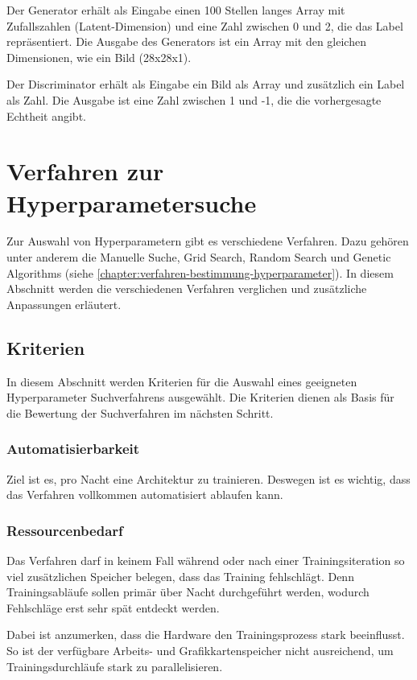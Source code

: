 Der Generator erhält als Eingabe einen 100 Stellen langes Array mit Zufallszahlen (Latent-Dimension) und eine Zahl zwischen 0 und 2, die das Label repräsentiert.
Die Ausgabe des Generators ist ein Array mit den gleichen Dimensionen, wie ein Bild (28x28x1).
\newline

Der Discriminator erhält als Eingabe ein Bild als Array und zusätzlich ein Label als Zahl.
Die Ausgabe ist eine Zahl zwischen 1 und -1, die die vorhergesagte Echtheit angibt.

\section{Verfahren zur Hyperparametersuche}
Zur Auswahl von Hyperparametern gibt es verschiedene Verfahren.
Dazu gehören unter anderem die Manuelle Suche, Grid Search, Random Search und Genetic Algorithms (siehe \cref{chapter:verfahren-bestimmung-hyperparameter}).
In diesem Abschnitt werden die verschiedenen Verfahren verglichen und zusätzliche Anpassungen erläutert.

\subsection{Kriterien}
In diesem Abschnitt werden Kriterien für die Auswahl eines geeigneten Hyperparameter Suchverfahrens ausgewählt.
Die Kriterien dienen als Basis für die Bewertung der Suchverfahren im nächsten Schritt.

\subsubsection{Automatisierbarkeit}
Ziel ist es, pro Nacht eine Architektur zu trainieren.
Deswegen ist es wichtig, dass das Verfahren vollkommen automatisiert ablaufen kann.

\subsubsection{Ressourcenbedarf}
Das Verfahren darf in keinem Fall während oder nach einer Trainingsiteration so viel zusätzlichen Speicher belegen, dass das Training fehlschlägt.
Denn Trainingsabläufe sollen primär über Nacht durchgeführt werden, wodurch Fehlschläge erst sehr spät entdeckt werden.
\newline

Dabei ist anzumerken, dass die Hardware den Trainingsprozess stark beeinflusst.
So ist der verfügbare Arbeits- und Grafikkartenspeicher nicht ausreichend, um Trainingsdurchläufe stark zu parallelisieren.

